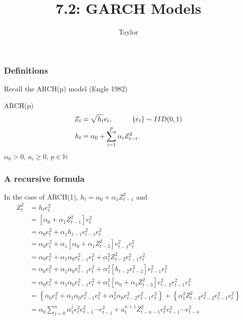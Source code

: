 \documentclass{beamer}
\title["7.2"]{7.2: GARCH Models}
\author{Taylor}
\institute[UVA] 
{
University of Virginia \\
\medskip
\textit{} 
}
\date{}
\begin{document}

\begin{frame}
\titlepage 
\end{frame}

\begin{frame}
\frametitle{Definitions}

Recall the ARCH(p) model (Engle 1982)
\begin{block}{ARCH(p)}
\begin{align*}
Z_t &= \sqrt{h_t}e_t, \hspace{10mm} \{e_t\} \sim IID(0,1) \\
h_t &= \alpha_0 + \sum_{i=1}^p \alpha_i Z^2_{t-i}.
\end{align*}
$\alpha_0 > 0$, $a_i \ge 0$, $p \in \mathbb{N}$
\end{block}


\end{frame}


\begin{frame}
\frametitle{A recursive formula}

In the case of ARCH(1), $h_t = \alpha_0 + \alpha_1 Z_{t-1}^2$ and
\begin{align*}
Z_t^2 &= h_t e_t^2\\
&= [\alpha_0 + \alpha_1 Z^2_{t-1}] e_t^2 \\
&= \alpha_0 e_t^2 + \alpha_1 h_{t-1} e_{t-1}^2 e_t^2 \\
&= \alpha_0 e_t^2 + \alpha_1 [\alpha_0 + \alpha_1 Z_{t-2}^2] e_{t-1}^2 e_t^2 \\
&= \alpha_0 e_t^2 + \alpha_1 \alpha_0e_{t-1}^2 e_t^2 + \alpha_1^2 Z_{t-2}^2 e_{t-1}^2 e_t^2 \\
&= \alpha_0 e_t^2 + \alpha_1 \alpha_0e_{t-1}^2 e_t^2 + \alpha_1^2 [h_{t-2}e_{t-2}^2] e_{t-1}^2 e_t^2 \\
&= \alpha_0 e_t^2 + \alpha_1 \alpha_0e_{t-1}^2 e_t^2 + \alpha_1^2 [\alpha_0 + \alpha_1 Z_{t-3}^2 ] e_{t-2}^2 e_{t-1}^2 e_t^2 \\
&=  \left\{\alpha_0 e_t^2 + \alpha_1 \alpha_0e_{t-1}^2 e_t^2  + \alpha_1^2 \alpha_0 e_{t-2}^2 e_{t-1}^2 e_t^2\right\} + \left\{\alpha_1^3  Z_{t-3}^2 e_{t-2}^2 e_{t-1}^2 e_t^2 \right\} \\
&= \alpha_0 \sum_{j=0}^n \alpha_1^j e_t^2 e_{t-1}^2 \cdots e_{t-j}^2 + a_1^{n+1}Z_{t-n-1}^2 e_t^2 e_{t-1}^2 \cdots e_{t-n}^2
\end{align*}


\end{frame}
\end{document}
